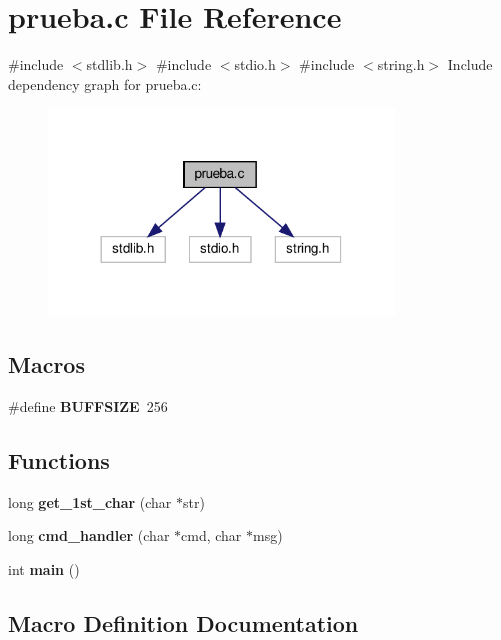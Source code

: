 \section{prueba.\+c File Reference}
\label{prueba_8c}
{\ttfamily \#include $<$stdlib.\+h$>$}\newline
{\ttfamily \#include $<$stdio.\+h$>$}\newline
{\ttfamily \#include $<$string.\+h$>$}\newline
Include dependency graph for prueba.\+c\+:\nopagebreak
\begin{figure}[H]
\begin{center}
\leavevmode
\includegraphics[width=260pt]{prueba_8c__incl}
\end{center}
\end{figure}
\subsection*{Macros}
\begin{DoxyCompactItemize}
\item 
\#define \textbf{ B\+U\+F\+F\+S\+I\+ZE}~256
\end{DoxyCompactItemize}
\subsection*{Functions}
\begin{DoxyCompactItemize}
\item 
long \textbf{ get\+\_\+1st\+\_\+char} (char $\ast$str)
\item 
long \textbf{ cmd\+\_\+handler} (char $\ast$cmd, char $\ast$msg)
\item 
int \textbf{ main} ()
\end{DoxyCompactItemize}


\subsection{Macro Definition Documentation}
\mbox{\label{prueba_8c_a39912bfe2a55f30e269196f9141d845d}} 
